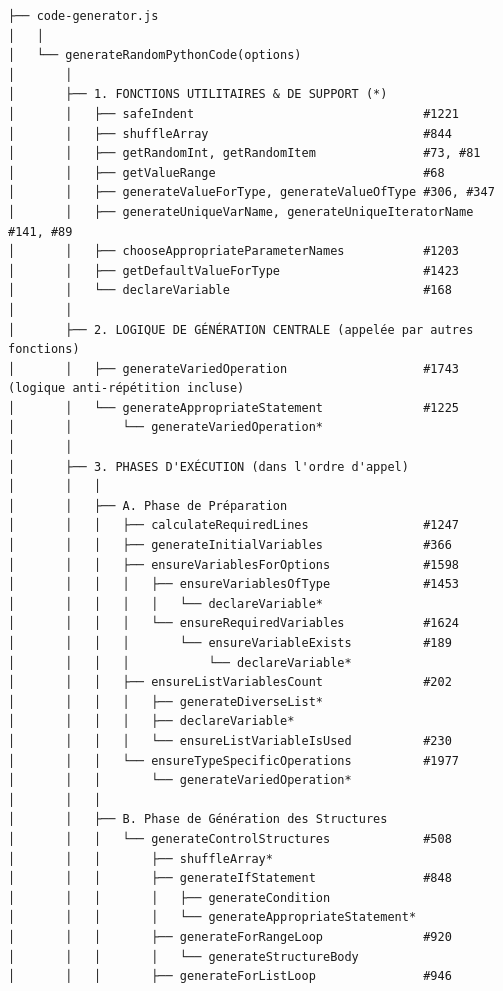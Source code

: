 \documentclass[11pt,a4paper]{article}
\begin{document}
%

\begin{verbatim}
├── code-generator.js
│   │
│   └── generateRandomPythonCode(options)
│       │
│       ├── 1. FONCTIONS UTILITAIRES & DE SUPPORT (*)
│       │   ├── safeIndent                                #1221
│       │   ├── shuffleArray                              #844
│       │   ├── getRandomInt, getRandomItem               #73, #81
│       │   ├── getValueRange                             #68
│       │   ├── generateValueForType, generateValueOfType #306, #347
│       │   ├── generateUniqueVarName, generateUniqueIteratorName #141, #89
│       │   ├── chooseAppropriateParameterNames           #1203
│       │   ├── getDefaultValueForType                    #1423
│       │   └── declareVariable                           #168
│       │
│       ├── 2. LOGIQUE DE GÉNÉRATION CENTRALE (appelée par autres fonctions)
│       │   ├── generateVariedOperation                   #1743 (logique anti-répétition incluse)
│       │   └── generateAppropriateStatement              #1225
│       │       └── generateVariedOperation*
│       │
│       ├── 3. PHASES D'EXÉCUTION (dans l'ordre d'appel)
│       │   │
│       │   ├── A. Phase de Préparation
│       │   │   ├── calculateRequiredLines                #1247
│       │   │   ├── generateInitialVariables              #366
│       │   │   ├── ensureVariablesForOptions             #1598
│       │   │   │   ├── ensureVariablesOfType             #1453
│       │   │   │   │   └── declareVariable*
│       │   │   │   └── ensureRequiredVariables           #1624
│       │   │   │       └── ensureVariableExists          #189
│       │   │   │           └── declareVariable*
│       │   │   ├── ensureListVariablesCount              #202
│       │   │   │   ├── generateDiverseList*
│       │   │   │   ├── declareVariable*
│       │   │   │   └── ensureListVariableIsUsed          #230
│       │   │   └── ensureTypeSpecificOperations          #1977
│       │   │       └── generateVariedOperation*
│       │   │
│       │   ├── B. Phase de Génération des Structures
│       │   │   └── generateControlStructures             #508
│       │   │       ├── shuffleArray*
│       │   │       ├── generateIfStatement               #848
│       │   │       │   ├── generateCondition
│       │   │       │   └── generateAppropriateStatement*
│       │   │       ├── generateForRangeLoop              #920
│       │   │       │   └── generateStructureBody
│       │   │       ├── generateForListLoop               #946

\end{verbatim}
\end{document}
